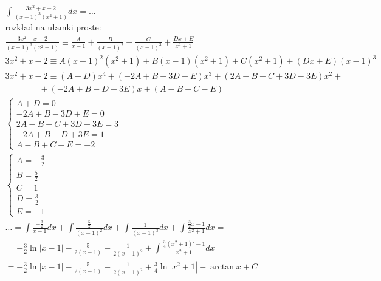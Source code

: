 
\begin{gather*}
  \int \frac{3x^2+x-2}{(x-1)^3(x^2+1)}dx = \ldots \\
  \text{rozkład na ułamki proste:} \\
  \frac{3x^2+x-2}{(x-1)^3(x^2+1)} \equiv \frac{A}{x-1}+ \frac{B}{(x-1)^2}+ \frac{C}{(x-1)^3}+ \frac{Dx+E}{x^2+1} \\
  3x^2+x-2 \equiv A(x-1)^2(x^2+1)+ B(x-1)(x^2+1)+ C(x^2+1)+ (Dx+E)(x-1)^3 \\
  3x^2+x-2 \equiv (A+D)x^4+(-2A+B-3D+E)x^3+(2A-B+C+3D-3E)x^2+ \\
    \qquad \qquad +(-2A+B-D+3E)x+ (A-B+C-E) \\
  \begin{cases} A+D=0 \\ -2A+B-3D+E=0 \\ 2A-B+C+3D-3E=3 \\ -2A+B-D+3E=1 \\ A-B+C-E=-2 \end{cases} \\
  \begin{cases} A=-\frac{3}{2} \\ B=\frac{5}{2} \\ C=1 \\ D=\frac{3}{2} \\ E=-1 \end{cases} \\
  \ldots = \int \frac{-\frac{3}{2}}{x-1}dx+ \int \frac{\frac{5}{2}}{(x-1)^2}dx+ \int \frac{1}{(x-1)^3}dx+ \int \frac{\frac{3}{2}x-1}{x^2+1}dx = \\
  = -\frac{3}{2}\ln|x-1|-\frac{5}{2(x-1)}-\frac{1}{2(x-1)^2}+\int \frac{\frac{3}{4}(x^2+1)'-1}{x^2+1}dx = \\
  = -\frac{3}{2}\ln|x-1|-\frac{5}{2(x-1)}-\frac{1}{2(x-1)^2}+\frac{3}{4}\ln|x^2+1|-\arctan x+C
\end{gather*}

